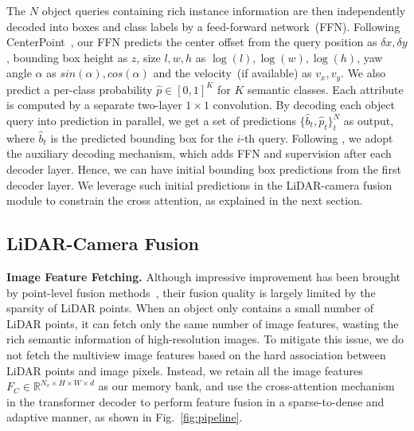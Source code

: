 The $N$ object queries containing rich instance information are then independently decoded into boxes and class labels by a feed-forward network~(FFN). 
Following CenterPoint~\cite{Yin2020Centerbased3O}, our FFN predicts the center offset from the query position as $\delta x, \delta y$, bounding box height as $z$, size $l, w, h$ as $\log(l), \log(w), \log(h)$, yaw angle $\alpha$ as $sin(\alpha), cos(\alpha)$ and the velocity~(if available) as $v_x, v_y$. We also predict a per-class probability $\hat p \in [0,1]^K$ for $K$ semantic classes. Each attribute is computed by a separate two-layer $ 1\times 1$ convolution. 
 By decoding each object query into prediction in parallel, we get a set of predictions $\{\hat b_t, \hat p_t\}_{t}^N$ as output, where $\hat b_t$ is the predicted bounding box for the $i$-th query. 
Following \cite{misra20213detr}, we adopt the auxiliary decoding mechanism{,} which adds FFN and supervision after each decoder layer{. Hence}, we {can} have initial bounding box predictions from the first decoder layer. We leverage such initial predictions in the LiDAR-camera fusion module to constrain the cross attention, {as} explained in {the} next section. 

















\subsection{LiDAR-Camera Fusion}

\noindent\textbf{Image Feature Fetching.} Although impressive improvement has been brought by point-level fusion methods~\cite{Vora2020PointPaintingSF, Wang2021PointAugmentingCA}, their fusion quality is largely limited by the sparsity of LiDAR points. When an object only contains a small number of LiDAR points, it can fetch {only} the same number of image features, wasting the rich semantic information of high-resolution images. To mitigate this issue, we do not fetch the multiview image features based on the hard association between LiDAR points and image pixels. Instead, we retain all the image features $F_C \in \mathbb{R}^{N_v \times H \times W \times d}$ as our memory bank, and use the cross-attention mechanism in {the} transformer decoder to perform feature fusion 
in a sparse-to-dense and adaptive manner, as shown in Fig.~\ref{fig:pipeline}. 



